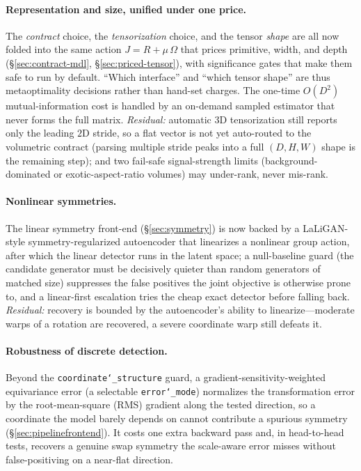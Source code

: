 \documentclass[11pt]{article}
\newcommand{\allowbreakhere}{\discretionary{}{}{}}
\newcommand{\code}[1]{\texttt{\def\_{\char`_\allowbreakhere}#1}}
\begin{document}
\paragraph{Representation and size, unified under one price.} The \emph{contract} choice, the
\emph{tensorization} choice, and the tensor \emph{shape} are all now folded into the same action
$J=R+\mu\,\Omega$ that prices primitive, width, and depth (\S\ref{sec:contract-mdl},
\S\ref{sec:priced-tensor}), with significance gates that make them safe to run by default. ``Which
interface'' and ``which tensor shape'' are thus metaoptimality decisions rather than hand-set charges. The
one-time $O(D^2)$ mutual-information cost is handled by an on-demand sampled estimator that never forms the
full matrix. \emph{Residual:} automatic $3$D tensorization still reports only the leading $2$D stride, so a
flat vector is not yet auto-routed to the volumetric contract (parsing multiple stride peaks into a full
$(D,H,W)$ shape is the remaining step); and two fail-safe signal-strength limits (background-dominated or
exotic-aspect-ratio volumes) may under-rank, never mis-rank.

\paragraph{Nonlinear symmetries.} The linear symmetry front-end (\S\ref{sec:symmetry}) is now backed by a
LaLiGAN-style symmetry-regularized autoencoder that linearizes a nonlinear group action, after which the
linear detector runs in the latent space; a null-baseline guard (the candidate generator must be decisively
quieter than random generators of matched size) suppresses the false positives the joint objective is
otherwise prone to, and a linear-first escalation tries the cheap exact detector before falling back.
\emph{Residual:} recovery is bounded by the autoencoder's ability to linearize---moderate warps of a
rotation are recovered, a severe coordinate warp still defeats it.

\paragraph{Robustness of discrete detection.} Beyond the \code{coordinate\_structure} guard, a
gradient-sensitivity-weighted equivariance error (a selectable \code{error\_mode}) normalizes the
transformation error by the root-mean-square (RMS) gradient along the tested direction, so a coordinate the model barely
depends on cannot contribute a spurious symmetry (\S\ref{sec:pipelinefrontend}). It costs one extra backward
pass and, in head-to-head tests, recovers a genuine swap symmetry the scale-aware error misses without
false-positiving on a near-flat direction.
\end{document}
